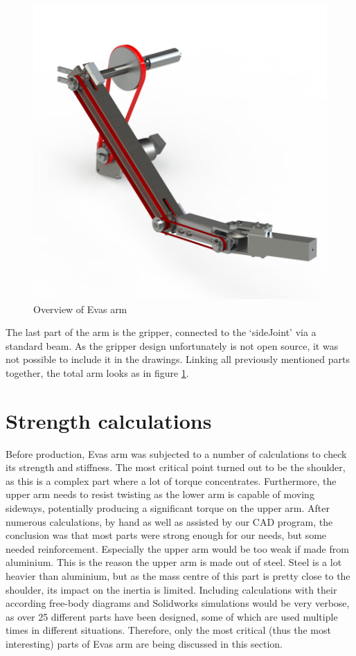 \documentclass[technical_document.tex]{subfiles}
\begin{document}
\begin{figure}[ht!]
	\centering
	\mbox{\includegraphics[scale=1.0]{Images/overview.png}}
	\caption{Overview of Eva\textquotesingle{}s arm}
	\label{fig:overview}
\end{figure}

The last part of the  arm is the gripper, connected to the ‘sideJoint’ via a standard beam. As the gripper design unfortunately is not open source, it was not possible to include it in the drawings. Linking all previously mentioned parts together, the total arm looks as in figure \ref{fig:overview}.


\section{Strength calculations}

Before production, Eva\textquotesingle{}s arm was subjected to a number of calculations to check its strength and stiffness. The most critical point turned out to be the shoulder, as this is a complex part where a lot of torque concentrates. Furthermore, the upper arm needs to resist twisting as the lower arm is capable of moving sideways, potentially producing a significant torque on the upper arm. After numerous calculations, by hand as well as assisted by our CAD program, the conclusion was that most parts were  strong enough for our needs, but some needed reinforcement. Especially the upper arm would be too weak if made from aluminium. This is the reason the upper arm is made out of steel. Steel is a lot heavier than aluminium, but as the mass centre of this part is pretty close to the shoulder, its impact on the inertia is limited.
Including calculations with their according free-body diagrams and Solidworks simulations would be very verbose, as over 25 different parts have been designed, some of which are used multiple times in different situations. Therefore, only the most critical (thus the most interesting) parts of Eva\textquotesingle{}s arm are being discussed in this section.
\end{document}
